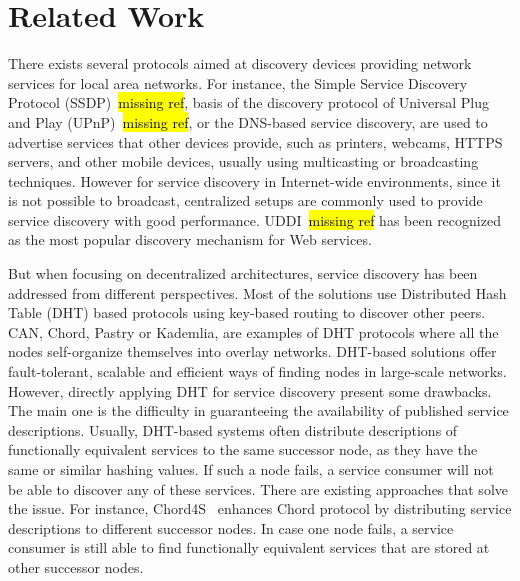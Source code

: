 
\section{Related Work}

There exists several protocols aimed at discovery devices providing network services for local area networks.
For instance, the Simple Service Discovery Protocol (SSDP)~\hl{missing ref},  basis of the discovery protocol of Universal Plug and Play (UPnP)~\hl{missing ref},  or the DNS-based service discovery,  are used to advertise services that other devices provide,  such as printers,  webcams,  HTTPS servers, and other mobile devices,  usually using multicasting or broadcasting techniques.
However for service discovery in Internet-wide environments, since it is not possible to broadcast,
centralized setups are commonly used to provide service discovery with good performance.
UDDI~\hl{missing ref} has been recognized as the most popular discovery mechanism for
Web services.

But when focusing on decentralized architectures,  service discovery has been addressed from different perspectives. 
Most of the solutions use Distributed Hash Table (DHT) based protocols using key-based routing to discover other peers. 
CAN, Chord,  Pastry or Kademlia,  are examples of DHT protocols where all the nodes self-organize themselves into overlay networks. 
DHT-based solutions offer fault-tolerant,  scalable and efficient ways of finding nodes in large-scale networks.
However,  directly applying DHT for service discovery  present some drawbacks.
The main one is the difficulty in guaranteeing the availability of published service descriptions.
Usually,  DHT-based systems often distribute descriptions of functionally equivalent services to the same successor node, 
as they have the same or similar hashing values. 
If such a node fails, a service consumer will not be able to discover any of these services. 
There are existing approaches that solve the issue. 
For instance,  Chord4S~\cite{chord4s} enhances Chord protocol by distributing service descriptions to different successor nodes. 
In case one node fails, a service consumer is still able to find functionally equivalent services that are stored at other successor nodes.


